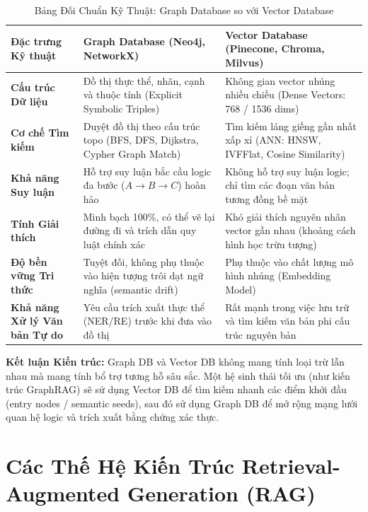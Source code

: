 \documentclass[12pt,a4paper]{report}
\begin{document}
\begin{table}[H]
\centering
\small
\renewcommand{\arraystretch}{1.3}
\caption{Bảng Đối Chuẩn Kỹ Thuật: Graph Database so với Vector Database}
\label{tab:graph_vs_vector}
\begin{tabularx}{\textwidth}{>{\RaggedRight\arraybackslash\bfseries}p{3.5cm} Y Y}
\toprule
\textbf{Đặc trưng Kỹ thuật} & \textbf{Graph Database (Neo4j, NetworkX)} & \textbf{Vector Database (Pinecone, Chroma, Milvus)} \\
\midrule
Cấu trúc Dữ liệu & Đồ thị thực thể, nhãn, cạnh và thuộc tính (Explicit Symbolic Triples) & Không gian vector nhúng nhiều chiều (Dense Vectors: 768 / 1536 dims) \\
Cơ chế Tìm kiếm & Duyệt đồ thị theo cấu trúc topo (BFS, DFS, Dijkstra, Cypher Graph Match) & Tìm kiếm láng giềng gần nhất xấp xỉ (ANN: HNSW, IVFFlat, Cosine Similarity) \\
Khả năng Suy luận & Hỗ trợ suy luận bắc cầu logic đa bước ($A \to B \to C$) hoàn hảo & Không hỗ trợ suy luận logic; chỉ tìm các đoạn văn bản tương đồng bề mặt \\
Tính Giải thích & Minh bạch 100\%, có thể vẽ lại đường đi và trích dẫn quy luật chính xác & Khó giải thích nguyên nhân vector gần nhau (khoảng cách hình học trừu tượng) \\
Độ bền vững Tri thức & Tuyệt đối, không phụ thuộc vào hiện tượng trôi dạt ngữ nghĩa (semantic drift) & Phụ thuộc vào chất lượng mô hình nhúng (Embedding Model) \\
Khả năng Xử lý Văn bản Tự do & Yêu cầu trích xuất thực thể (NER/RE) trước khi đưa vào đồ thị & Rất mạnh trong việc lưu trữ và tìm kiếm văn bản phi cấu trúc nguyên bản \\
\bottomrule
\end{tabularx}
\end{table}

\textbf{Kết luận Kiến trúc:} Graph DB và Vector DB không mang tính loại trừ lẫn nhau mà mang tính bổ trợ tương hỗ sâu sắc. Một hệ sinh thái tối ưu (như kiến trúc GraphRAG) sẽ sử dụng Vector DB để tìm kiếm nhanh các điểm khởi đầu (entry nodes / semantic seeds), sau đó sử dụng Graph DB để mở rộng mạng lưới quan hệ logic và trích xuất bằng chứng xác thực.

\newpage

\chapter{Các Thế Hệ Kiến Trúc Retrieval-Augmented Generation (RAG)}
\end{document}

